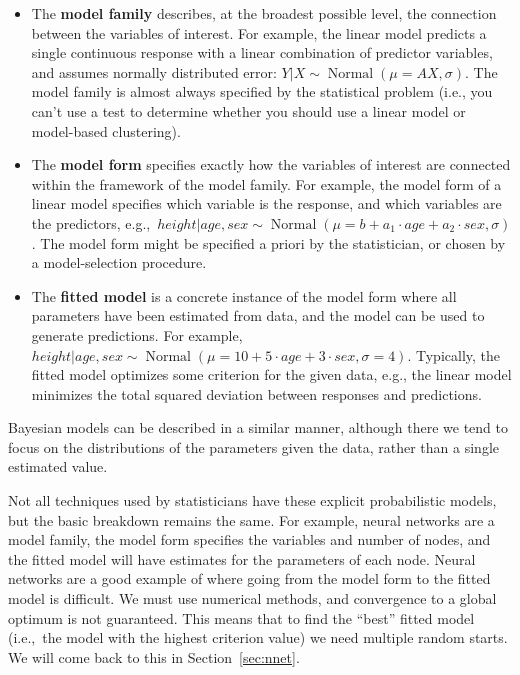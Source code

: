 \documentclass[preprint]{imsart}
\DeclareMathOperator{\Normal}{Normal}
\begin{document}
\begin{itemize}

  \item The {\bf model family} describes, at the broadest possible level, the connection between the variables of interest. For example, the linear model predicts a single continuous response with a linear combination of predictor variables, and assumes normally distributed error: $Y | X \sim \Normal(\mu = AX, \sigma)$. The model family is almost always specified by the statistical problem (i.e., you can't use a test to determine whether you should use a linear model or model-based clustering).

  \item The {\bf model form} specifies exactly how the variables of interest are connected within the framework of the model family. For example, the model form of a linear model specifies which variable is the response, and which variables are the predictors, e.g.,\ $height | age, sex \sim \Normal(\mu = b + a_1 \cdot age + a_2 \cdot sex, \sigma)$. The model form might be specified a priori by the statistician, or chosen by a model-selection procedure.

  \item The {\bf fitted model} is a concrete instance of the model form where all parameters have been estimated from data, and the model can be used to generate predictions. For example, $height | age, sex \sim \Normal(\mu = 10 + 5 \cdot age + 3 \cdot sex, \sigma = 4)$. Typically, the fitted model optimizes some criterion for the given data, e.g., the linear model minimizes the total squared deviation between responses and predictions.

\end{itemize}

Bayesian models can be described in a similar manner, although there we tend to focus on the distributions of the parameters given the data, rather than a single estimated value.

Not all techniques used by statisticians have these explicit probabilistic models, but the basic breakdown remains the same.  For example, neural networks are a model family, the model form specifies the variables and number of nodes, and the fitted model will have estimates for the parameters of each node.  Neural networks are a good example of where going from the model form to the fitted model is difficult.  We must use numerical methods, and convergence to a global optimum is not guaranteed.  This means that to find the ``best'' fitted model (i.e.,\ the model with the highest criterion value) we need multiple random starts.  We will come back to this in Section~\ref{sec:nnet}.
\end{document}
